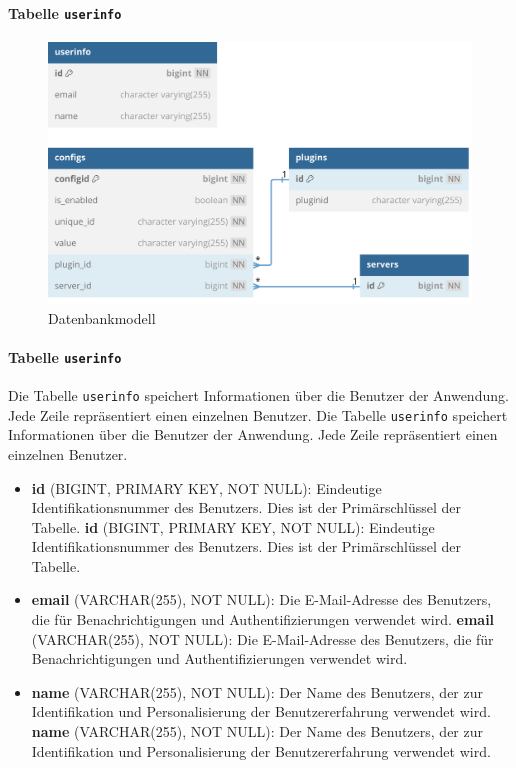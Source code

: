 \paragraph{\texorpdfstring{Tabelle \texttt{userinfo}}{Tabelle userinfo}}\label{tabelle-userinfo}
\begin{figure}[!htbp]
  \centering
  \includegraphics[width=\textwidth]{images/20240529-dbschema.png}
  \caption{Datenbankmodell}\label{fig:database-schema}
\end{figure}
  
\paragraph{\texorpdfstring{Tabelle \texttt{userinfo}}{Tabelle userinfo}}\label{tabelle-userinfo}

Die Tabelle \texttt{userinfo} speichert Informationen über die Benutzer der Anwendung. Jede Zeile repräsentiert einen einzelnen Benutzer.
Die Tabelle \texttt{userinfo} speichert Informationen über die Benutzer der Anwendung. Jede Zeile repräsentiert einen einzelnen Benutzer.

\begin{itemize}
\item
  \textbf{id} (BIGINT, PRIMARY KEY, NOT NULL): Eindeutige Identifikationsnummer des Benutzers. Dies ist der Primärschlüssel der Tabelle.
  \textbf{id} (BIGINT, PRIMARY KEY, NOT NULL): Eindeutige Identifikationsnummer des Benutzers. Dies ist der Primärschlüssel der Tabelle.
\item
  \textbf{email} (VARCHAR(255), NOT NULL): Die E-Mail-Adresse des Benutzers, die für Benachrichtigungen und Authentifizierungen verwendet wird.
  \textbf{email} (VARCHAR(255), NOT NULL): Die E-Mail-Adresse des Benutzers, die für Benachrichtigungen und Authentifizierungen verwendet wird.
\item
  \textbf{name} (VARCHAR(255), NOT NULL): Der Name des Benutzers, der zur Identifikation und Personalisierung der Benutzererfahrung verwendet wird.
  \textbf{name} (VARCHAR(255), NOT NULL): Der Name des Benutzers, der zur Identifikation und Personalisierung der Benutzererfahrung verwendet wird.
\end{itemize}

